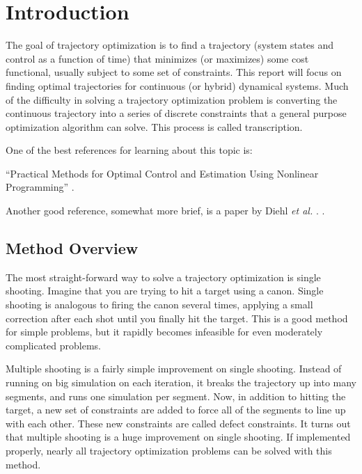 \section{Introduction}

The goal of trajectory optimization is to find a trajectory (system states and control as a function of time) that minimizes (or maximizes) some cost functional, usually subject to some set of constraints. This report will focus on finding optimal trajectories for continuous (or hybrid) dynamical systems. Much of the difficulty in solving a trajectory optimization problem is converting the continuous trajectory into a series of discrete constraints that a general purpose optimization algorithm can solve. This process is called transcription.

\par One of the best references for learning about this topic is: 

 ``Practical Methods for Optimal Control and Estimation Using Nonlinear Programming'' \cite{JohnT.Betts2001}. 
 
 Another good reference, somewhat more brief, is a paper by Diehl {\em et al.} \cite{Diehl2009}. .

\subsection{Method Overview}

The most straight-forward way to solve a trajectory optimization is single shooting. Imagine that you are trying to hit a target using a canon. Single shooting is analogous to firing the canon several times, applying a small correction after each shot until you finally hit the target. This is a good method for simple problems, but it rapidly becomes infeasible for even moderately complicated problems.

\par Multiple shooting is a fairly simple improvement on single shooting. Instead of running on big simulation on each iteration, it breaks the trajectory up into many segments, and runs one simulation per segment. Now, in addition to hitting the target, a new set of constraints are added to force all of the segments to line up with each other. These new constraints are called defect constraints. It turns out that multiple shooting is a huge improvement on single shooting. If implemented properly, nearly all trajectory optimization problems can be solved with this method. 

